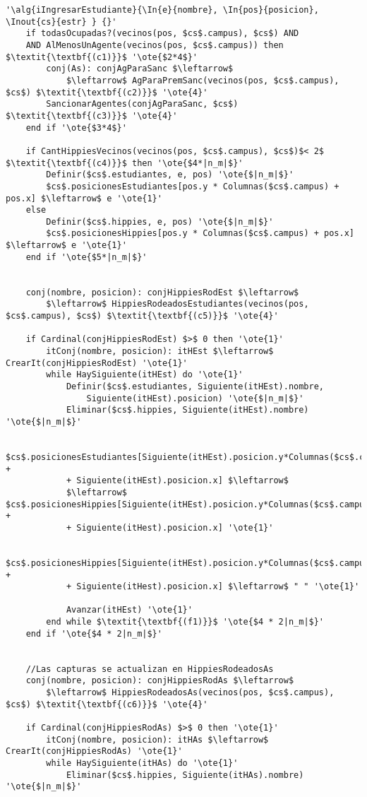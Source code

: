 \begin{lstlisting}[mathescape]
'\alg{iIngresarEstudiante}{\In{e}{nombre}, \In{pos}{posicion}, \Inout{cs}{estr} } {}'
	if todasOcupadas?(vecinos(pos, $cs$.campus), $cs$) AND
	AND AlMenosUnAgente(vecinos(pos, $cs$.campus)) then $\textit{\textbf{(c1)}}$ '\ote{$2*4$}'
		conj(As): conjAgParaSanc $\leftarrow$
			$\leftarrow$ AgParaPremSanc(vecinos(pos, $cs$.campus), $cs$) $\textit{\textbf{(c2)}}$ '\ote{4}'
		SancionarAgentes(conjAgParaSanc, $cs$) $\textit{\textbf{(c3)}}$ '\ote{4}'
	end if '\ote{$3*4$}'

	if CantHippiesVecinos(vecinos(pos, $cs$.campus), $cs$)$< 2$ $\textit{\textbf{(c4)}}$ then '\ote{$4*|n_m|$}'
		Definir($cs$.estudiantes, e, pos) '\ote{$|n_m|$}'
		$cs$.posicionesEstudiantes[pos.y * Columnas($cs$.campus) + pos.x] $\leftarrow$ e '\ote{1}'
	else
		Definir($cs$.hippies, e, pos) '\ote{$|n_m|$}'
		$cs$.posicionesHippies[pos.y * Columnas($cs$.campus) + pos.x] $\leftarrow$ e '\ote{1}'
	end if '\ote{$5*|n_m|$}'


	conj(nombre, posicion): conjHippiesRodEst $\leftarrow$
		$\leftarrow$ HippiesRodeadosEstudiantes(vecinos(pos, $cs$.campus), $cs$) $\textit{\textbf{(c5)}}$ '\ote{4}'

	if Cardinal(conjHippiesRodEst) $>$ 0 then '\ote{1}'
		itConj(nombre, posicion): itHEst $\leftarrow$ CrearIt(conjHippiesRodEst) '\ote{1}'
		while HaySiguiente(itHEst) do '\ote{1}'
			Definir($cs$.estudiantes, Siguiente(itHEst).nombre,
				Siguiente(itHEst).posicion) '\ote{$|n_m|$}'
			Eliminar($cs$.hippies, Siguiente(itHEst).nombre) '\ote{$|n_m|$}'

			$cs$.posicionesEstudiantes[Siguiente(itHEst).posicion.y*Columnas($cs$.campus) +
			+ Siguiente(itHEst).posicion.x] $\leftarrow$
			$\leftarrow$ $cs$.posicionesHippies[Siguiente(itHEst).posicion.y*Columnas($cs$.campus) +
			+ Siguiente(itHest).posicion.x] '\ote{1}'

			$cs$.posicionesHippies[Siguiente(itHEst).posicion.y*Columnas($cs$.campus) +
			+ Siguiente(itHest).posicion.x] $\leftarrow$ " " '\ote{1}'

			Avanzar(itHEst) '\ote{1}'
		end while $\textit{\textbf{(f1)}}$ '\ote{$4 * 2|n_m|$}'
	end if '\ote{$4 * 2|n_m|$}'


	//Las capturas se actualizan en HippiesRodeadosAs
	conj(nombre, posicion): conjHippiesRodAs $\leftarrow$
		$\leftarrow$ HippiesRodeadosAs(vecinos(pos, $cs$.campus), $cs$) $\textit{\textbf{(c6)}}$ '\ote{4}'

	if Cardinal(conjHippiesRodAs) $>$ 0 then '\ote{1}'
		itConj(nombre, posicion): itHAs $\leftarrow$ CrearIt(conjHippiesRodAs) '\ote{1}'
		while HaySiguiente(itHAs) do '\ote{1}'
			Eliminar($cs$.hippies, Siguiente(itHAs).nombre) '\ote{$|n_m|$}'


\end{lstlisting}
